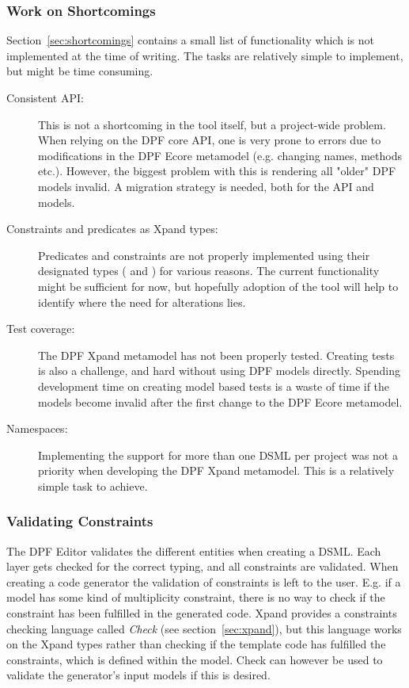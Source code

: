 \subsubsection{Work on Shortcomings}
Section~\ref{sec:shortcomings} contains a small list of functionality which is not implemented at the time of writing. The tasks are relatively simple to implement, but might be time consuming.

\begin{description}
  \item[Consistent API:] This is not a shortcoming in the tool itself, but a project-wide problem. When relying on the DPF core API, one is very prone to errors due to modifications in the DPF Ecore metamodel (e.g. changing names, methods etc.). However, the biggest problem with this is rendering all "older" DPF models invalid. A migration strategy is needed, both for the API and models.
  \item[Constraints and predicates as Xpand types:] Predicates and constraints are not properly implemented using their designated types ( and ) for various reasons. The current functionality might be sufficient for now, but hopefully adoption of the tool will help to identify where the need for alterations lies.
  \item[Test coverage:] The DPF Xpand metamodel has not been properly tested. Creating tests is also a challenge, and hard without using DPF models directly. Spending development time on creating model based tests is a waste of time if the models become invalid after the first change to the DPF Ecore metamodel.
  \item[Namespaces:] Implementing the support for more than one DSML per project was not a priority when developing the DPF Xpand metamodel. This is a relatively simple task to achieve.
\end{description}

\subsubsection{Validating Constraints}
The DPF Editor validates the different entities when creating a DSML. Each layer gets checked for the correct typing, and all constraints are validated. When creating a code generator the validation of constraints is left to the user. E.g. if a model has some kind of multiplicity constraint, there is no way to check if the constraint has been fulfilled in the generated code. Xpand provides a constraints checking language called \emph{Check} (see section~\ref{sec:xpand}), but this language works on the Xpand types rather than checking if the template code has fulfilled the constraints, which is defined within the model. Check can however be used to validate the generator's input models if this is desired.

